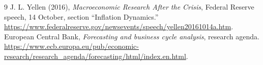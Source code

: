 \documentclass[11pt]{article}
\theoremstyle{definition}
\begin{document}
\begin{thebibliography}{9}
 J. L. Yellen (2016), \emph{Macroeconomic Research After the Crisis}, Federal Reserve speech, 14 October, section ``Inflation Dynamics.'' \url{https://www.federalreserve.gov/newsevents/speech/yellen20161014a.htm}.
 European Central Bank, \emph{Forecasting and business cycle analysis}, research agenda. \url{https://www.ecb.europa.eu/pub/economic-research/research_agenda/forecasting/html/index.en.html}.
\end{thebibliography}
\end{document}
